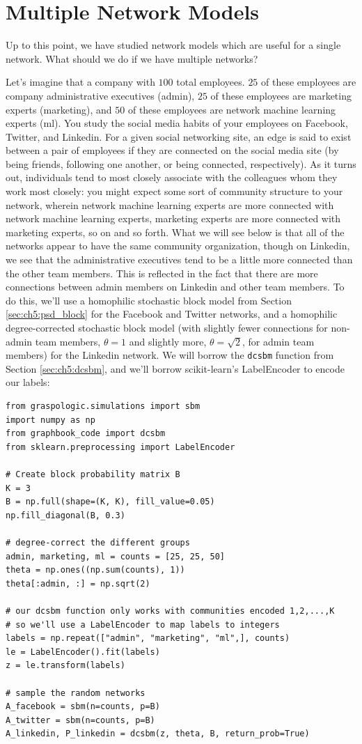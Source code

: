 \section{Multiple Network Models}
\label{sec:ch5:multi}

Up to this point, we have studied network models which are useful for a single network. What should we do if we have multiple networks?

Let's imagine that a company with $100$ total employees. $25$ of these employees are company administrative executives (admin), $25$ of these employees are marketing experts (marketing), and $50$ of these employees are network machine learning experts (ml). You study the social media habits of your employees on Facebook, Twitter, and Linkedin. For a given social networking site, an edge is said to exist between a pair of employees if they are connected on the social media site (by being friends, following one another, or being connected, respectively). As it turns out, individuals tend to most closely associate with the colleagues whom they work most closely: you might expect some sort of community structure to your network, wherein network machine learning experts are more connected with network machine learning experts, marketing experts are more connected with marketing experts, so on and so forth. What we will see below is that all of the networks appear to have the same community organization, though on Linkedin, we see that the administrative executives tend to be a little more connected than the other team members. This is reflected in the fact that there are more connections between admin members on Linkedin and other team members. To do this, we'll use a homophilic stochastic block model from Section \ref{sec:ch5:psd_block} for the Facebook and Twitter networks, and a homophilic degree-corrected stochastic block model (with slightly fewer connections for non-admin team members, $\theta = 1$ and slightly more, $\theta=\sqrt 2$, for admin team members) for the Linkedin network. We will borrow the \texttt{dcsbm} function from Section \ref{sec:ch5:dcsbm}, and we'll borrow scikit-learn's LabelEncoder to encode our labels:

\begin{lstlisting}[style=python]
from graspologic.simulations import sbm
import numpy as np
from graphbook_code import dcsbm
from sklearn.preprocessing import LabelEncoder

# Create block probability matrix B
K = 3
B = np.full(shape=(K, K), fill_value=0.05)
np.fill_diagonal(B, 0.3)

# degree-correct the different groups
admin, marketing, ml = counts = [25, 25, 50]
theta = np.ones((np.sum(counts), 1))
theta[:admin, :] = np.sqrt(2)

# our dcsbm function only works with communities encoded 1,2,...,K
# so we'll use a LabelEncoder to map labels to integers
labels = np.repeat(["admin", "marketing", "ml",], counts)
le = LabelEncoder().fit(labels)
z = le.transform(labels)

# sample the random networks
A_facebook = sbm(n=counts, p=B)
A_twitter = sbm(n=counts, p=B)
A_linkedin, P_linkedin = dcsbm(z, theta, B, return_prob=True)
\end{lstlisting}

